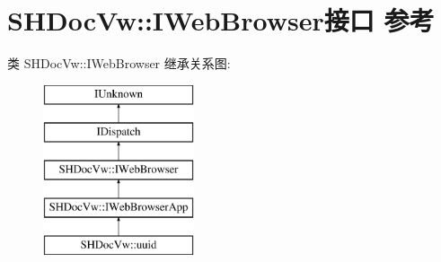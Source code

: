 \hypertarget{interface_s_h_doc_vw_1_1_i_web_browser}{}\section{S\+H\+Doc\+Vw\+:\+:I\+Web\+Browser接口 参考}
\label{interface_s_h_doc_vw_1_1_i_web_browser}
类 S\+H\+Doc\+Vw\+:\+:I\+Web\+Browser 继承关系图\+:\begin{figure}[H]
\begin{center}
\leavevmode
\includegraphics[height=5.000000cm]{interface_s_h_doc_vw_1_1_i_web_browser}
\end{center}
\end{figure}
